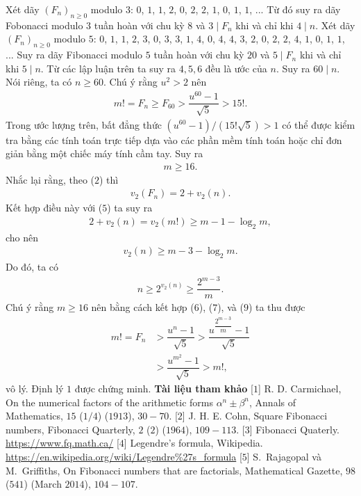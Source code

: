 \begin{multicols}{2}
	\vskip 0.1cm	
	Xét dãy $(F_n)_{n\geq 0}$  modulo $3$: $0$, $1$, $1$, $2$, $0$, $2$, $2$, $1$, $0$, $1$, $1$, $...$ Từ đó suy ra dãy Fobonacci modulo $3$ tuần hoàn với chu kỳ $8$ và $3\mid F_n$ khi và chỉ khi $4\mid n$.
	\vskip 0.1cm
	Xét dãy $(F_n)_{n\geq 0}$ modulo $5$:
	$0$, $1$, $1$, $2$, $3$, $0$, $3$, $3$, $1$, $4$, $0$, $4$, $4$, $3$, $2$, $0$, $2$, $2$, $4$, $1$, $0$, $1$, $1$, $...$
	Suy ra dãy Fibonacci modulo $5$ tuần hoàn với chu kỳ $20$ và $5\mid F_n$ khi và chỉ khi $5\mid n$. 
	\vskip 0.1cm	
	Từ các lập luận trên ta suy ra $4,5,6$ đều là ước của $n$. Suy ra $60\mid n$. Nói riêng, ta có $n\geq 60$. Chú ý rằng $u^2>2$ nên
	\begin{align*}
		m!=F_n\geq F_{60}>\dfrac{u^{60}-1}{\sqrt{5}}>15!.
	\end{align*}
	Trong ước lượng trên, bất đẳng thức $(u^{60}-1)/(15!\sqrt{5})>1$ có thể được kiểm tra bằng các tính toán trực tiếp dựa vào các phần mềm tính toán hoặc chỉ đơn giản bằng một chiếc máy tính cầm tay.
	Suy ra 
	\begin{align*}
		m\geq 16.
	\end{align*} 
	Nhắc lại rằng, theo ($2$) thì
	\begin{align*}
		v_2(F_n)=2+v_2(n).
	\end{align*}
	Kết hợp điều này với ($5$) ta suy ra 
	\begin{align*}
		2+v_2(n)= v_2(m!)\geq m-1-\log_2 m,
	\end{align*}
	cho nên 
	\begin{align*}
		v_2(n)\geq m-3-\log_2 m.
	\end{align*}
	Do đó, ta có 
	\begin{align*}
			n\geq 2^{v_2(n)}\geq  \dfrac{2^{m-3}}{m}. \tag{$9$}
	\end{align*}
	Chú ý rằng $m\geq 16$ nên bằng cách kết hợp ($6$), ($7$), và ($9$) ta thu được
	\begin{align*}
		m!=F_n&>\dfrac{u^n-1}{\sqrt{5}}>\dfrac{u^{\dfrac{2^{m-3}}{m}}-1}{\sqrt{5}}\\&>\dfrac{u^{m^2}-1}{\sqrt{5}}>m!,
	\end{align*}
	vô lý. Định lý $1$ được chứng minh.
	\vskip 0.1cm
	\textbf{\color{hoccungpi}Tài liệu tham khảo}
	\vskip 0.1cm
	[$1$] R. D. Carmichael, On the numerical factors of the arithmetic forms $\alpha^n\pm \beta^n$, Annals of Mathematics, $15$ ($1/4$) ($1913$), $30-70$.
	\vskip 0.1cm
	[$2$] J. H. E. Cohn, Square Fibonacci numbers, Fibonacci Quarterly, $2$ ($2$)
		($1964$), $109-113$.
	\vskip 0.1cm
	[$3$] Fibonacci Quaterly. \url{https://www.fq.math.ca/}
	\vskip 0.1cm
	[$4$] Legendre's formula, Wikipedia. \url{https://en.wikipedia.org/wiki/Legendre%27s_formula}
	\vskip 0.1cm
	[$5$] S.~Rajagopal và M.~Griffiths,  On Fibonacci numbers that are factorials, Mathematical Gazette, {$98$} ($541$) (March $2014$), $104-107$.
\end{multicols}
